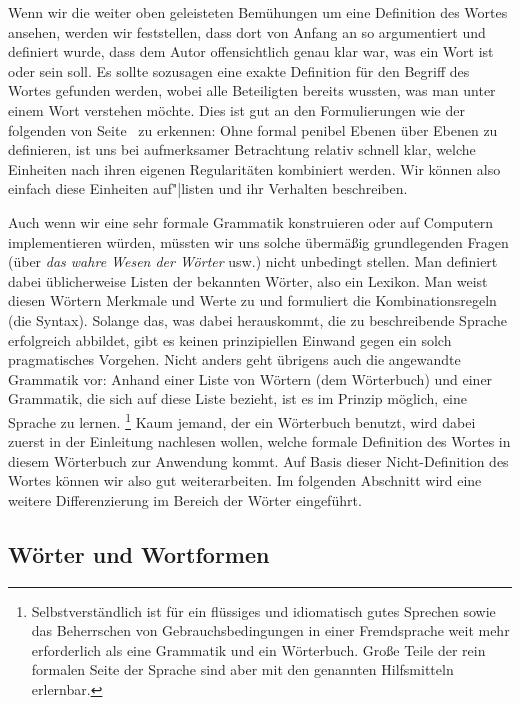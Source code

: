 Wenn wir die weiter oben geleisteten Bemühungen um eine Definition des Wortes ansehen, werden wir feststellen, dass dort von Anfang an so argumentiert und definiert wurde, dass dem Autor offensichtlich genau klar war, was ein Wort ist oder sein soll.
Es sollte sozusagen eine exakte Definition für den Begriff des Wortes gefunden werden, wobei alle Beteiligten bereits wussten, was man unter einem Wort verstehen möchte.
Dies ist gut an den Formulierungen wie der folgenden von Seite~\pageref{arbref:9234645} zu erkennen:
\textit{\Quotenonphonoleinheitwort}
Ohne formal penibel Ebenen über Ebenen zu definieren, ist uns bei aufmerksamer Betrachtung relativ schnell klar, welche Einheiten nach ihren eigenen Regularitäten kombiniert werden.
Wir können also einfach diese Einheiten auf"|listen und ihr Verhalten beschreiben.

Auch wenn wir eine sehr formale Grammatik konstruieren oder auf Computern implementieren würden, müssten wir uns solche übermäßig grundlegenden Fragen (über \textit{das wahre Wesen der Wörter} usw.) nicht unbedingt stellen.
Man definiert dabei üblicherweise Listen der bekannten Wörter, also ein Lexikon.
Man weist diesen Wörtern Merkmale und Werte zu und formuliert die Kombinationsregeln (die Syntax).
Solange das, was dabei herauskommt, die zu beschreibende Sprache erfolgreich abbildet, gibt es keinen prinzipiellen Einwand gegen ein solch pragmatisches Vorgehen.
Nicht anders geht übrigens auch die angewandte Grammatik vor:
Anhand einer Liste von Wörtern (dem Wörterbuch) und einer Grammatik, die sich auf diese Liste bezieht, ist es im Prinzip möglich, eine Sprache zu lernen.%
\footnote{Selbstverständlich ist für ein flüssiges und idiomatisch gutes Sprechen sowie das Beherrschen von Gebrauchsbedingungen in einer Fremdsprache weit mehr erforderlich als eine Grammatik und ein Wörterbuch.
Große Teile der rein formalen Seite der Sprache sind aber mit den genannten Hilfsmitteln erlernbar.}
Kaum jemand, der ein Wörterbuch benutzt, wird dabei zuerst in der Einleitung nachlesen wollen, welche formale Definition des Wortes in diesem Wörterbuch zur Anwendung kommt.
Auf Basis dieser Nicht-Definition des Wortes können wir also gut weiterarbeiten.
Im folgenden Abschnitt wird eine weitere Differenzierung im Bereich der Wörter eingeführt.

\subsection{Wörter und Wortformen}
\label{sec:woerterundwortformen}


